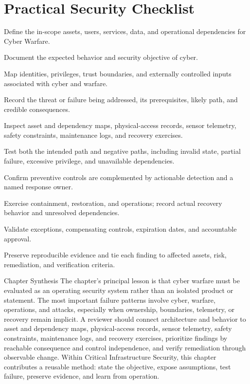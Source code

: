 \documentclass[11pt,letterpaper]{article}
\begin{document}
\section*{Practical Security Checklist}
\begin{CornellChecklist}
\item Define the in-scope assets, users, services, data, and operational dependencies for Cyber Warfare.
\item Document the expected behavior and security objective of cyber.
\item Map identities, privileges, trust boundaries, and externally controlled inputs associated with cyber and warfare.
\item Record the threat or failure being addressed, its prerequisites, likely path, and credible consequences.
\item Inspect asset and dependency maps, physical-access records, sensor telemetry, safety constraints, maintenance logs, and recovery exercises.
\item Test both the intended path and negative paths, including invalid state, partial failure, excessive privilege, and unavailable dependencies.
\item Confirm preventive controls are complemented by actionable detection and a named response owner.
\item Exercise containment, restoration, and operations; record actual recovery behavior and unresolved dependencies.
\item Validate exceptions, compensating controls, expiration dates, and accountable approval.
\item Preserve reproducible evidence and tie each finding to affected assets, risk, remediation, and verification criteria.
\end{CornellChecklist}
\begin{CornellSummaryBox}{Chapter Synthesis}
The chapter's principal lesson is that cyber warfare must be evaluated as an operating security system rather than an isolated product or statement. The most important failure patterns involve cyber, warfare, operations, and attacks, especially when ownership, boundaries, telemetry, or recovery remain implicit. A reviewer should connect architecture and behavior to asset and dependency maps, physical-access records, sensor telemetry, safety constraints, maintenance logs, and recovery exercises, prioritize findings by reachable consequence and control independence, and verify remediation through observable change. Within Critical Infrastructure Security, this chapter contributes a reusable method: state the objective, expose assumptions, test failure, preserve evidence, and learn from operation.
\end{CornellSummaryBox}
\end{document}
